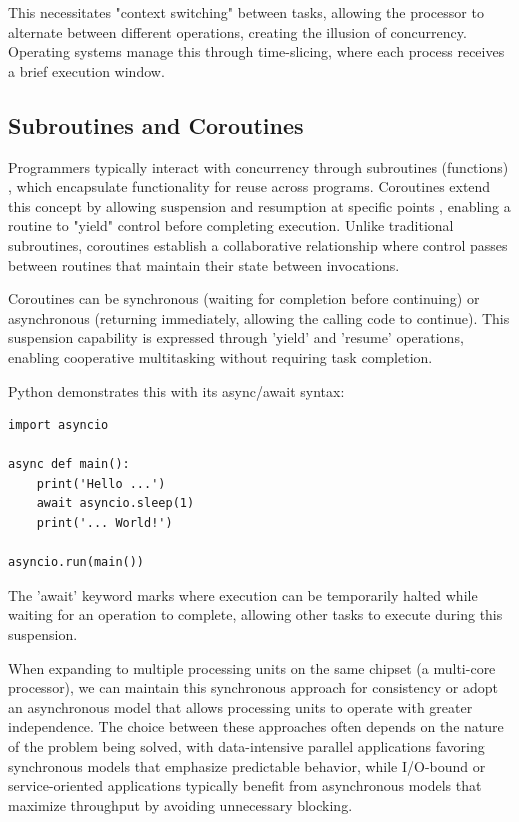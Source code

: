 \documentclass[12pt,a4paper]{article}
\begin{document}
This necessitates "context switching"\parencite[p. 4]{Rauber2023} between tasks, allowing the processor to alternate between different operations, creating the illusion of concurrency. Operating systems manage this through time-slicing, where each process receives a brief execution window.

\subsection{Subroutines and Coroutines}

Programmers typically interact with concurrency through subroutines (functions) \parencite{Pyeatt2020}, which encapsulate functionality for reuse across programs. Coroutines extend this concept by allowing suspension and resumption at specific points \parencite{DeMouna2009}, enabling a routine to "yield" control before completing execution. Unlike traditional subroutines, coroutines establish a collaborative relationship where control passes between routines that maintain their state between invocations.

Coroutines can be synchronous (waiting for completion before continuing) or asynchronous (returning immediately, allowing the calling code to continue). This suspension capability is expressed through 'yield' and 'resume' operations, enabling cooperative multitasking without requiring task completion.

Python demonstrates this with its async/await syntax:
\begin{verbatim}
import asyncio

async def main():
    print('Hello ...')
    await asyncio.sleep(1)
    print('... World!')

asyncio.run(main())
\end{verbatim}

The 'await' keyword marks where execution can be temporarily halted while waiting for an operation to complete, allowing other tasks to execute during this suspension.

When expanding to multiple processing units on the same chipset (a multi-core processor), we can maintain this synchronous approach for consistency or adopt an asynchronous model that allows processing units to operate with greater independence. The choice between these approaches often depends on the nature of the problem being solved, with data-intensive parallel applications favoring synchronous models that emphasize predictable behavior, while I/O-bound or service-oriented applications typically benefit from asynchronous models that maximize throughput by avoiding unnecessary blocking.
\end{document}

